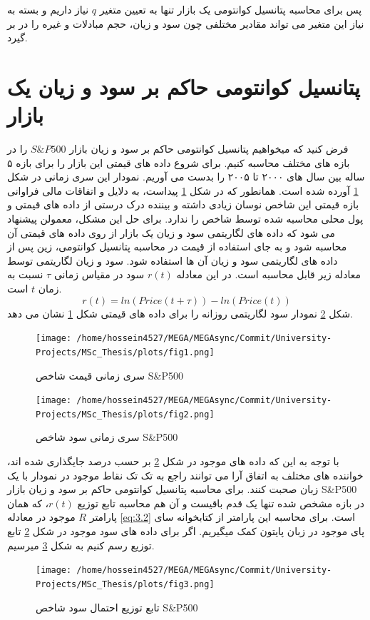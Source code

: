 \documentclass[a4paper,titlepage,12pt,fleqn,oneside]{report}
\begin{document}
پس برای محاسبه پتانسیل کوانتومی یک بازار تنها به تعیین متغیر $q$ نیاز داریم و بسته به نیاز این متغیر می تواند مقادیر مختلفی چون سود و زیان، حجم مبادلات و غیره را در بر گیرد. 
\section{پتانسیل کوانتومی حاکم بر سود و زیان یک بازار}
فرض کنید که میخواهیم پتانسیل کوانتومی  حاکم بر سود و زیان بازار 
$S\&P500$
را در بازه های مختلف محاسبه کنیم.
برای شروع داده های قیمتی  این بازار را برای بازه ۵ ساله بین سال های ۲۰۰۰ تا ۲۰۰۵ را بدست می آوریم. نمودار این سری زمانی در شکل
\ref{fig:1}
 آورده شده است.
همانطور که در شکل 
\ref{fig:1}
پیداست، به دلایل و اتفاقات مالی فراوانی بازه قیمتی این شاخص نوسان زیادی داشته و بیننده درک درستی از داده های قیمتی و پول محلی محاسبه شده توسط شاخص را ندارد. برای حل این مشکل، معمولن پیشنهاد می شود که داده های لگاریتمی سود و زیان یک بازار از روی داده های قیمتی آن محاسبه شود و به جای استفاده از قیمت در محاسبه پتانسیل کوانتومی، زین پس از داده های لگاریتمی سود و زیان آن ها استفاده شود. سود و زیان لگاریتمی توسط معادله زیر قابل محاسبه است. در این معادله $r(t)$  سود در مقیاس زمانی $\tau$ نسبت به زمان $t$ است.
\begin{equation}
r(t) = ln\left(Price(t+\tau)\right)-ln\left(Price\left(t\right)\right)
\label{eq:3.2}
\end{equation}
شکل 
\ref{fig:2}
نمودار سود لگاریتمی روزانه را برای داده های قیمتی شکل 
\ref{fig:1}
نشان می دهد.
\begin{figure}[ptb]
	\centering
	\texttt{[image: /home/hossein4527/MEGA/MEGAsync/Commit/University-Projects/MSc\_Thesis/plots/fig1.png]}
	\caption{سری زمانی قیمت شاخص S\&P500}
	\label{fig:1}
\end{figure}
\begin{figure}[ptb]
	\centering
	\texttt{[image: /home/hossein4527/MEGA/MEGAsync/Commit/University-Projects/MSc\_Thesis/plots/fig2.png]}
	\caption{سری زمانی سود شاخص S\&P500}
	\label{fig:2}
\end{figure}
با توجه به این که داده های موجود در شکل 
\ref{fig:2}
بر حسب درصد جایگذاری شده اند، خواننده های مختلف به اتفاق آرا می توانند راجع به تک تک نقاط موجود در نمودار با یک زبان صحبت کنند.
برای محاسبه پتانسیل کوانتومی حاکم بر سود و زیان بازار 
S\&P500
در بازه مشخص شده تنها یک قدم باقیست و آن هم محاسبه تابع توزیع $r(t)$، که همان پارامتر $R$ موجود در معادله 
\ref{eq:3.2}
است. برای محاسبه این پارامتر از کتابخوانه سای پای موجود در زبان پایتون کمک میگیریم. اگر برای داده های سود موجود در شکل 
\ref{fig:2}
تابع توزیع رسم کنیم به شکل
\ref{fig:3}
میرسیم.
\begin{figure}[ptb]
	\centering
	\texttt{[image: /home/hossein4527/MEGA/MEGAsync/Commit/University-Projects/MSc\_Thesis/plots/fig3.png]}
	\caption{تابع توزیع احتمال سود شاخص S\&P500}
	\label{fig:3}
\end{figure}
\end{document}
